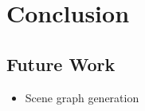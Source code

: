 \chapter{Conclusion}

\section{Future Work}

\begin{itemize}
  \item Scene graph generation
\end{itemize}
